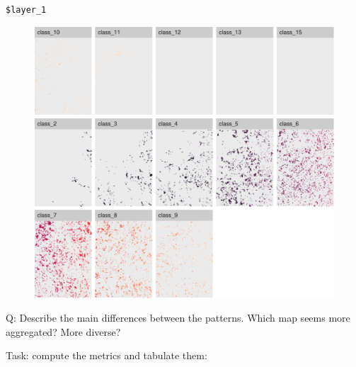 \documentclass[
  letterpaper,
  DIV=11,
  numbers=noendperiod]{scrartcl}
\begin{document}
\begin{verbatim}
$layer_1
\end{verbatim}

\begin{figure}[H]

{\centering \includegraphics{PatternAnalysisWorkshopTutorial_files/figure-pdf/show.patches.all-2.pdf}

}

\end{figure}

Q: Describe the main differences between the patterns. Which map seems
more aggregated? More diverse?

Task: compute the metrics and tabulate them:
\end{document}
